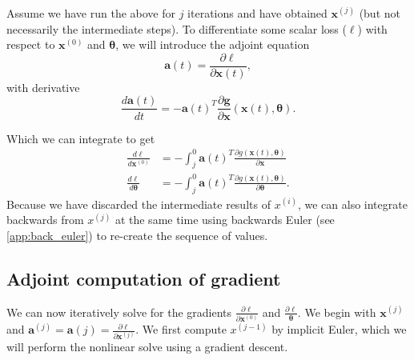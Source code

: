 \documentclass{article}
\renewcommand{\vec}[1]{\bm{{#1}}}
\theoremstyle{definition}
\begin{document}
Assume we have run the above for $j$ iterations and have obtained $\vec{x}^{(j)}$ (but not necessarily the intermediate steps).  To differentiate some scalar loss ($\ell$) with respect to $\vec{x}^{(0)}$ and $\vec{\theta}$, we will introduce the adjoint equation
\begin{equation}
  \vec{a}(t) = \frac{\partial \ell}{\partial \vec{x}(t)},
\end{equation}
with derivative
\begin{equation}
  \frac{d\vec{a}(t)}{dt} = -\vec{a}(t)^T \frac{\partial \vec{g}}{\partial \vec{x}}\left(\vec{x}(t), \vec{\theta}\right).
\end{equation}

Which we can integrate to get
\begin{align}
  \frac{d\ell}{d\vec{x}^{(0)}} &= -\int_{j}^{0} \vec{a}\left(t\right)^T \frac{\partial g\left(\vec{x}(t), \vec{\theta}\right)}{\partial \vec{x}} \\
  \frac{d\ell}{d\vec{\theta}} &= -\int_{j}^{0} \vec{a}\left(t\right)^T \frac{\partial g\left(\vec{x}(t), \vec{\theta}\right)}{\partial \vec{\theta}}.
\end{align}
Because we have discarded the intermediate results of $x^{(i)}$, we can also integrate backwards from $x^{(j)}$ at the same time using backwards Euler (see \cref{app:back_euler}) to re-create the sequence of values.

\subsection{Adjoint computation of gradient}
We can now iteratively solve for the gradients $\frac{\partial \ell}{\partial \vec{x}^{(0)}}$ and $\frac{\partial \ell}{\vec{\theta}}$.  We begin with $\vec{x}^{(j)}$ and $\vec{a}^{(j)}=\vec{a}(j)=\frac{\partial \ell}{\partial \vec{x}^{(j)}}$.  We first compute $x^{(j-1)}$ by implicit Euler, which we will perform the nonlinear solve using a gradient descent.
\end{document}
